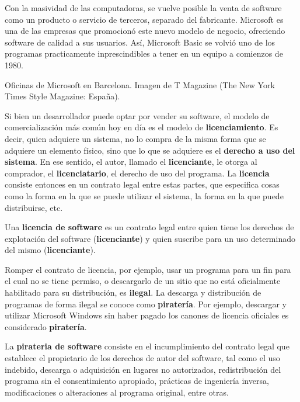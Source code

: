 Con la masividad de las computadoras, se vuelve posible la venta de software
como un producto o servicio de terceros, separado del fabricante. Microsoft
es una de las empresas que promocionó este nuevo modelo de negocio, ofreciendo
software de calidad a sus usuarios. Así, Microsoft Basic se volvió uno de los
programas practicamente inprescindibles a tener en un equipo a comienzos de 1980.

{Oficinas de Microsoft en Barcelona.}
{Imagen de T Magazine (The New York Times Style Magazine: España).}

Si bien un desarrollador puede optar por vender su software, el modelo de
comercialización más común hoy en día es el modelo de \textbf{licenciamiento}.
Es decir, quien adquiere un sistema, no lo compra de la misma forma que se
adquiere un elemento físico, sino que lo que se adquiere es el \textbf{derecho a
uso del sistema}. En ese sentido, el autor, llamado el \textbf{licenciante}, le
otorga al comprador, el \textbf{licenciatario}, el derecho de uso del programa.
La \textbf{licencia} consiste entonces en un contrato legal entre estas partes,
que especifica cosas como la forma en la que se puede utilizar el sistema, la
forma en la que puede distribuirse, etc.

\begin{definition}
    Una \textbf{licencia de software} es un contrato legal entre quien tiene los
    derechos de explotación del software (\textbf{licenciante}) y quien suscribe
    para un uso determinado del mismo (\textbf{licenciante}).
\end{definition}

Romper el contrato de licencia, por ejemplo, usar un programa para un fin para
el cual no se tiene permiso, o descargarlo de un sitio que no está oficialmente
habilitado para su distribución, es \textbf{ilegal}. La descarga y distribución
de programas de forma ilegal se conoce como \textbf{piratería}. Por ejemplo,
descargar y utilizar Microsoft Windows sin haber pagado los canones de licencia
oficiales es considerado \textbf{piratería}.

\begin{definition}
    La \textbf{pirateria de software} consiste en el incumplimiento del contrato
    legal que establece el propietario de los derechos de autor del software,
    tal como el uso indebido, descarga o adquisición en lugares no autorizados,
    redistribución del programa sin el consentimiento apropiado, prácticas de
    ingeniería inversa, modificaciones o alteraciones al programa original,
    entre otras.
\end{definition}

